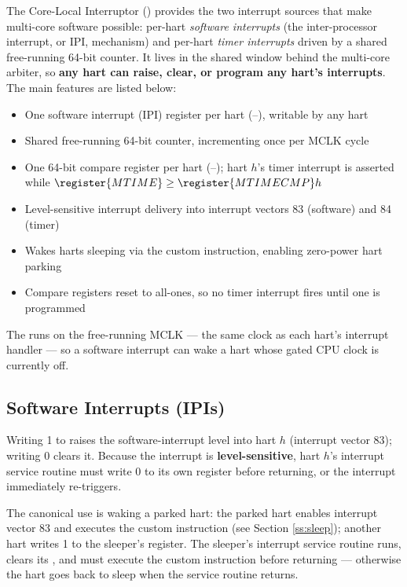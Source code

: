 The Core-Local Interruptor () provides the two interrupt sources that make multi-core software possible: per-hart \textit{software interrupts} (the inter-processor interrupt, or IPI, mechanism) and per-hart \textit{timer interrupts} driven by a shared free-running 64-bit counter. It lives in the shared window behind the multi-core arbiter, so \textbf{any hart can raise, clear, or program any hart's interrupts}. The main features are listed below:

\begin{itemize}
	\item One software interrupt (IPI) register per hart (--), writable by any hart
	\item Shared free-running 64-bit  counter, incrementing once per MCLK cycle
	\item One 64-bit compare register per hart (--); hart $h$'s timer interrupt is asserted while $\register{MTIME} \geq \register{MTIMECMP}h$
	\item Level-sensitive interrupt delivery into interrupt vectors 83 (software) and 84 (timer)
	\item Wakes harts sleeping via the custom  instruction, enabling zero-power hart parking
	\item Compare registers reset to all-ones, so no timer interrupt fires until one is programmed
\end{itemize}

The  runs on the free-running MCLK --- the same clock as each hart's interrupt handler --- so a software interrupt can wake a hart whose gated CPU clock is currently off.

\subsection{Software Interrupts (IPIs)}

Writing 1 to  raises the software-interrupt level into hart $h$ (interrupt vector 83); writing 0 clears it. Because the interrupt is \textbf{level-sensitive}, hart $h$'s interrupt service routine must write 0 to its own  register before returning, or the interrupt immediately re-triggers.

The canonical use is waking a parked hart: the parked hart enables interrupt vector 83 and executes the custom  instruction (see Section \ref{ss:sleep}); another hart writes 1 to the sleeper's  register. The sleeper's interrupt service routine runs, clears its , and must execute the custom  instruction before returning --- otherwise the hart goes back to sleep when the service routine returns.

